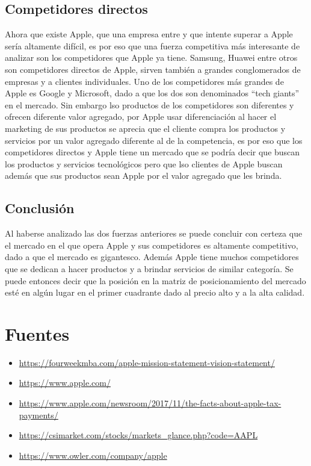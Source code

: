 \documentclass{article}
\begin{document}
\subsection{Competidores directos}
Ahora que existe Apple, que una empresa entre y que intente superar a Apple sería altamente difícil, es por eso que una fuerza competitiva más interesante de analizar son los competidores que Apple ya tiene. Samsung, Huawei entre otros son competidores directos de Apple, sirven también a grandes conglomerados de empresas y a clientes individuales. Uno de los competidores más grandes de Apple es Google y Microsoft, dado a que los dos son denominados ``tech giants'' en el mercado. Sin embargo lso productos de los competidores son diferentes y ofrecen diferente valor agregado, por Apple usar diferenciación al hacer el marketing de sus productos se aprecia que el cliente compra los productos y servicios por un valor agregado diferente al de la competencia, es por eso que los competidores directos y Apple tiene un mercado que se podría decir que buscan los productos y servicios tecnológicos pero que lso clientes de Apple buscan además que sus productos sean Apple por el valor agregado que les brinda.

\subsection{Conclusión}
Al haberse analizado las dos fuerzas anteriores se puede concluir con certeza que el mercado en el que opera Apple y sus competidores es altamente competitivo, dado a que el mercado es gigantesco. Además Apple tiene muchos competidores que se dedican a hacer productos y a brindar servicios de similar categoría. 
Se puede entonces decir que la posición en la matriz de posicionamiento del mercado esté en algún lugar en el primer cuadrante dado al precio alto y a la alta calidad. 

\section{Fuentes}
\begin{itemize}
    \item \url{https://fourweekmba.com/apple-mission-statement-vision-statement/}
    \item \url{https://www.apple.com/}
    \item \url{https://www.apple.com/newsroom/2017/11/the-facts-about-apple-tax-payments/}
    \item \url{https://csimarket.com/stocks/markets_glance.php?code=AAPL}
    \item \url{https://www.owler.com/company/apple}
\end{itemize}
\end{document}
